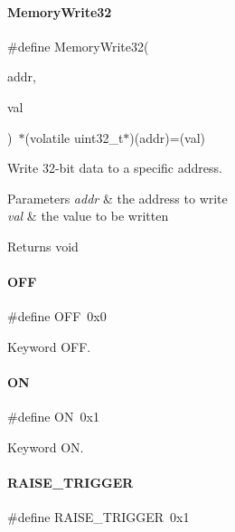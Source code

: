 \paragraph{\texorpdfstring{Memory\+Write32}{MemoryWrite32}}
{\footnotesize\ttfamily \#define Memory\+Write32(\begin{DoxyParamCaption}\item[{}]{addr,  }\item[{}]{val }\end{DoxyParamCaption})~$\ast$(volatile uint32\+\_\+t$\ast$)(addr)=(val)}



Write 32-\/bit data to a specific address. 


\begin{DoxyParams}{Parameters}
{\em addr} & the address to write \\
\hline
{\em val} & the value to be written \\
\hline
\end{DoxyParams}
\begin{DoxyReturn}{Returns}
void 
\end{DoxyReturn}
\mbox{\label{a00020_a29e413f6725b2ba32d165ffaa35b01e5}} 
\paragraph{\texorpdfstring{O\+FF}{OFF}}
{\footnotesize\ttfamily \#define O\+FF~0x0}

Keyword O\+FF. \mbox{\label{a00020_ad76d1750a6cdeebd506bfcd6752554d2}} 
\paragraph{\texorpdfstring{ON}{ON}}
{\footnotesize\ttfamily \#define ON~0x1}

Keyword ON. \mbox{\label{a00020_abda90eda34a640b130f48a6ade23fe22}} 
\paragraph{\texorpdfstring{R\+A\+I\+S\+E\+\_\+\+T\+R\+I\+G\+G\+ER}{RAISE\_TRIGGER}}
{\footnotesize\ttfamily \#define R\+A\+I\+S\+E\+\_\+\+T\+R\+I\+G\+G\+ER~0x1}

